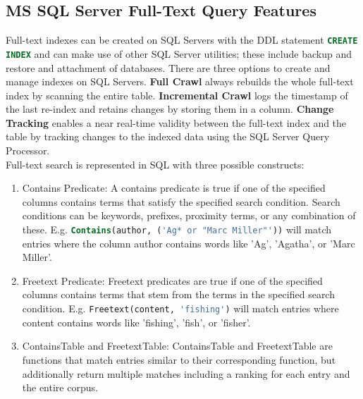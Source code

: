 \subsection{MS SQL Server Full-Text Query Features}
Full-text indexes can be created on \ac{SQL} Servers with the \ac{DDL} statement \lstinline[language=SQL]$CREATE INDEX$ and can make use of other \ac{SQL} Server utilities; these include backup and restore and attachment of databases. There are three options to create and manage indexes on \ac{SQL} Servers. \textbf{Full Crawl} always rebuilds the whole full-text index by scanning the entire table. \textbf{Incremental Crawl} logs the timestamp of the last re-index and retains changes by storing them in a column. \textbf{Change Tracking} enables a near real-time validity between the full-text index and the table by tracking changes to the indexed data using the \ac{SQL} Server Query Processor. \parencite[cf.][p. 9]{hamilton_microsoft_2001}\\
Full-text search is represented in \ac{SQL} with three possible constructs: \parencite[cf.][p. 9]{hamilton_microsoft_2001}
\begin{enumerate}
    \item Contains Predicate: A contains predicate is true if one of the specified columns contains terms that satisfy the specified search condition. Search conditions can be keywords, prefixes, proximity terms, or any combination of these. E.g. \lstinline[language=SQL]$Contains(author, ('Ag* or "Marc Miller"'))$ will match entries where the column author contains words like 'Ag', 'Agatha', or 'Marc Miller'.
    \item Freetext Predicate: Freetext predicates are true if one of the specified columns contains terms that stem from the terms in the specified search condition. E.g. \lstinline[language=SQL]$Freetext(content, 'fishing')$ will match entries where content contains words like 'fishing', 'fish', or 'fisher'.
    \item ContainsTable and FreetextTable: ContainsTable and FreetextTable are functions that match entries similar to their corresponding function, but additionally return multiple matches including a ranking for each entry and the entire corpus.
\end{enumerate}